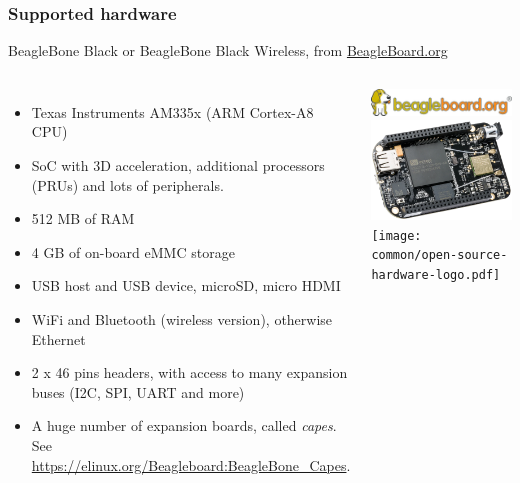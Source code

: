 \begin{frame}
\frametitle{Supported hardware}
  BeagleBone Black or BeagleBone Black Wireless, from
\href{https://beagleboard.org}{BeagleBoard.org}
  \begin{columns}
    \footnotesize
    \begin{itemize}
      \item Texas Instruments AM335x (ARM Cortex-A8 CPU)
      \item SoC with 3D acceleration, additional processors
        (PRUs) and lots of peripherals.
      \item 512 MB of RAM
      \item 4 GB of on-board eMMC storage
      \item USB host and USB device, microSD, micro HDMI
      \item WiFi and Bluetooth (wireless version), otherwise Ethernet
      \item 2 x 46 pins headers, with access to many expansion buses
        (I2C, SPI, UART and more)
      \item A huge number of expansion boards, called {\em capes}.
        See \url{https://elinux.org/Beagleboard:BeagleBone_Capes}.
    \end{itemize}
    \begin{center}
      \includegraphics[width=\textwidth]{slides/beagleboneblack-board/beagle_logo_326x60.png}\\
      \includegraphics[width=\textwidth]{slides/beagleboneblack-board/beagleboneblack.png}\\
      \texttt{[image: common/open-source-hardware-logo.pdf]}
    \end{center}
  \end{columns}
\end{frame}
